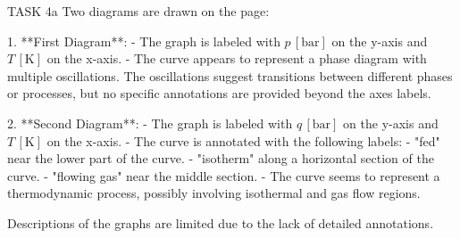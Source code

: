 TASK 4a  
Two diagrams are drawn on the page:

1. **First Diagram**:  
   - The graph is labeled with \( p \, [\text{bar}] \) on the y-axis and \( T \, [\text{K}] \) on the x-axis.  
   - The curve appears to represent a phase diagram with multiple oscillations. The oscillations suggest transitions between different phases or processes, but no specific annotations are provided beyond the axes labels.

2. **Second Diagram**:  
   - The graph is labeled with \( q \, [\text{bar}] \) on the y-axis and \( T \, [\text{K}] \) on the x-axis.  
   - The curve is annotated with the following labels:  
     - "fed" near the lower part of the curve.  
     - "isotherm" along a horizontal section of the curve.  
     - "flowing gas" near the middle section.  
   - The curve seems to represent a thermodynamic process, possibly involving isothermal and gas flow regions.  

Descriptions of the graphs are limited due to the lack of detailed annotations.